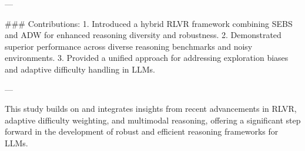 ---

### Contributions:
1. Introduced a hybrid RLVR framework combining SEBS and ADW for enhanced reasoning diversity and robustness.
2. Demonstrated superior performance across diverse reasoning benchmarks and noisy environments.
3. Provided a unified approach for addressing exploration biases and adaptive difficulty handling in LLMs.

--- 

This study builds on and integrates insights from recent advancements in RLVR, adaptive difficulty weighting, and multimodal reasoning, offering a significant step forward in the development of robust and efficient reasoning frameworks for LLMs.